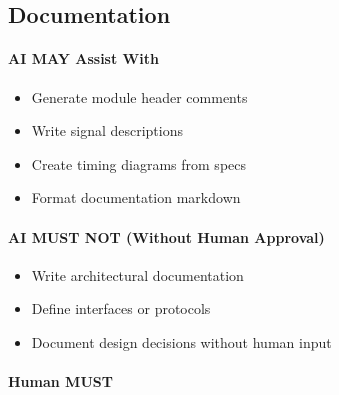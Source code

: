 \subsection{Documentation}\label{cr:status:phase1-ai-human-responsibilities:documentation}

\paragraph{\texorpdfstring{\ok{} AI MAY Assist
With}{ AI MAY Assist With}}\label{cr:status:phase1-ai-human-responsibilities:white-check-mark-ai-may-assist-with-18}

\begin{record}

\begin{itemize}
\tightlist
\item
  Generate module header comments
\item
  Write signal descriptions
\item
  Create timing diagrams from specs
\item
  Format documentation markdown
\end{itemize}

\end{record}

\paragraph{\texorpdfstring{\warn{} AI MUST NOT (Without Human
Approval)}{ AI MUST NOT (Without Human Approval)}}\label{cr:status:phase1-ai-human-responsibilities:warning-ai-must-not-without-human-approval-18}

\begin{record}

\begin{itemize}
\tightlist
\item
  Write architectural documentation
\item
  Define interfaces or protocols
\item
  Document design decisions without human input
\end{itemize}

\end{record}

\paragraph{\texorpdfstring{\hold{} Human MUST}{ Human MUST}}\label{cr:status:phase1-ai-human-responsibilities:raised-hand-human-must-18}

